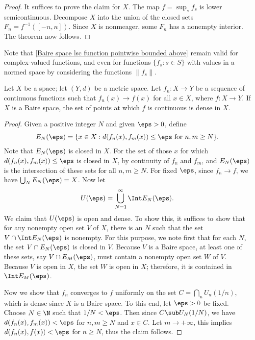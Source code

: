 \begin{proof}
It suffices to prove the claim for $X$. The map $f=\sup_sf_s$ is lower semicontinuous. Decompose $X$ into the union of the closed sets $F_n=f^{-1}([-n,n])$. Since $X$ is nonmeager, some $F_n$ has a nonempty interior. The theorem now follows.
\end{proof}
Note that \cref{Baire space lsc function pointwise bounded above} remain valid for complex-valued functions, and even for functions $\{f_s:s\in S\}$ with values in a normed space by considering the functions $\|f_s\|$.
\begin{proposition}\label{Baire space limit of continuous function}
Let $X$ be a space; let $(Y,d)$ be a metric space. Let $f_n:X\to Y$ be a sequence of continuous functions such that $f_n(x)\to f(x)$ for all $x\in X$, where $f:X\to Y$. If $X$ is a Baire space, the set of points at which $f$ is continuous is dense in $X$.
\end{proposition}
\begin{proof}
Given a positive integer $N$ and given $\eps>0$, define
\[E_N(\eps)=\{x\in X:d(f_n(x),f_m(x))\leq\eps\text{ for $n,m\geq N$}\}.\]
Note that $E_N(\eps)$ is closed in $X$. For the set of those $x$ for which $d(f_n(x),f_m(x))\leq\eps$ is closed in $X$, by continuity of $f_n$ and $f_m$, and $E_N(\eps)$ is the intersection of these sets for all $n,m\geq N$. For fixed $\eps$, since $f_n\to f$, we have $\bigcup_NE_N(\eps)=X$. Now let
\[U(\eps)=\bigcup_{N=1}^{\infty}\Int E_N(\eps).\]
We claim that $U(\eps)$ is open and dense. To show this, it suffices to show that for any nonempty open set $V$ of $X$, there is an $N$ such that the set $V\cap\Int E_N(\eps)$ is nonempty. For this purpose, we note first that for each $N$, the set $V\cap E_N(\eps)$ is closed in $V$. Because $V$ is a Baire space, at least one of these sets, say $V\cap E_M(\eps)$, must contain a nonempty open set $W$ of $V$. Because $V$ is open in $X$, the set $W$ is open in $X$; therefore, it is contained in $\Int E_M(\eps)$.\par
Now we show that $f_n$ converges to $f$ uniformly on the set $C=\bigcap_nU_n(1/n)$, which is dense since $X$ is a Baire space. To this end, let $\eps>0$ be fixed. Choose $N\in\N$ such that $1/N<\eps$. Then since $C\sub U_N(1/N)$, we have $d(f_n(x),f_m(x))<\eps$ for $n,m\geq N$ and $x\in C$. Let $m\to+\infty$, this implies $d(f_n(x),f(x))<\eps$ for $n\geq N$, thus the claim follows.
\end{proof}
